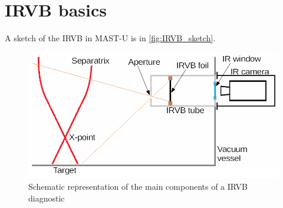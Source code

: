 \section{IRVB basics}

A sketch of the IRVB in MAST-U is in \autoref{fig:IRVB_sketch}.

\begin{figure}
	\centering
	\includegraphics[width=0.7\linewidth]{Chapters/chapter2/figs/IRVB cartoon.png}
	\caption{Schematic representation of the main components of a IRVB diagnostic}
	\label{fig:IRVB_sketch}
\end{figure}

